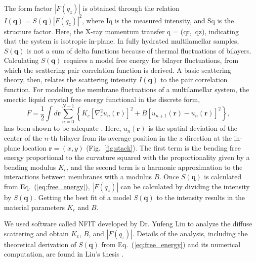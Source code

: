 The form factor $|F(q_z)|$ is obtained through the relation
$I(\mathbf{q})= S(\mathbf{q})|F(q_z)|^2$, where \gls{Iq} is the measured intensity,
and \gls{Sq} is the structure factor.
Here, the X-ray momentum transfer \gls{q} = (\gls{qr},~\gls{qz}), indicating that the system is isotropic in-plane. 
In fully hydrated multilamellar samples, $S(\mathbf{q})$ is not a sum of delta 
functions because of thermal fluctuations of bilayers. Calculating $S(\mathbf{q})$
requires a model free energy for bilayer fluctuations, from which the scattering
pair correlation function is derived. A basic scattering theory, then, relates
the scattering intensity $I(\mathbf{q})$ to the pair correlation function. 
For modeling the membrane fluctuations of a multilamellar system, 
the smectic liquid crystal free energy functional in the discrete form,
\begin{equation}
  F=\frac{1}{2}\int d\mathbf{r}\sum _{n=0}^{N-1}\left\{ 
  K_{c} \left[\nabla _{r}^{2}u_{n}\left(\mathbf{r}\right)\right]^{2}
  +B\left[u_{n+1}\left(\mathbf{r}\right)-u_{n}\left(\mathbf{r}\right)\right]^{2}
  \right\},
  \label{eq:free_energy}
\end{equation}
has been shown to be adequate \cite{Lyatskaya01}.
Here, $u_{n}\left(\mathbf{r}\right)$ is the spatial deviation of the center 
of the $n$-th bilayer from its average position in the $z$ direction
at the in-plane location $\mathbf{r}=(x,y)$ (Fig.~\ref{fig:stack}).
The first term is the bending free energy proportional to the curvature
squared with the proportionality given by a bending modulus $K_{c}$, and
the second term is a harmonic approximation to the interactions between
membranes with a modulus $B$. 
Once $S(\mathbf{q})$ is calculated 
from Eq.~(\ref{eq:free_energy}), $|F(q_z)|$ can 
be calculated by dividing the intensity by $S(\mathbf{q})$. 
Getting the best fit of a model $S(\mathbf{q})$ to the intensity results in 
the material parameters $K_c$ and $B$.

We used software called NFIT developed by Dr. Yufeng Liu
\cite{Lyatskaya01,Liu04,Liu03} to analyze the diffuse scattering and
obtain $K_c$, $B$, and $|F(q_z)|$. 
Details of the analysis, including the theoretical derivation of
$S(\mathbf{q})$ from Eq.~(\ref{eq:free_energy}) and its
numerical computation, are found in Liu's thesis 
\cite{Liu03}. 

